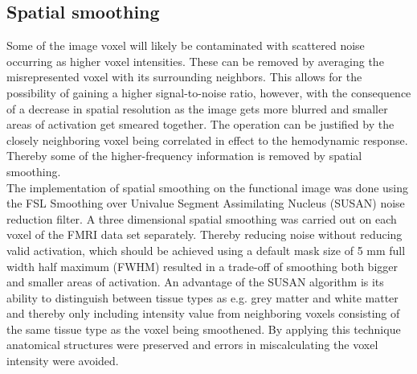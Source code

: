     
%
%

\subsection{Spatial smoothing}

Some of the image voxel will likely be contaminated with scattered noise occurring as higher voxel intensities. These can be removed by averaging the misrepresented voxel with its surrounding neighbors. This allows for the possibility of gaining a higher signal-to-noise ratio, however, with the consequence of a decrease in spatial resolution as the image gets more blurred and smaller areas of activation get smeared together. The operation can be justified by the closely neighboring voxel being correlated in effect to the hemodynamic response. Thereby some of the higher-frequency information is removed by spatial smoothing. \cite{Poldrack2011} \\
The implementation of spatial smoothing on the functional image was done using the FSL Smoothing over Univalue Segment Assimilating Nucleus (SUSAN) noise reduction filter. A three dimensional spatial smoothing was carried out on each voxel of the FMRI data set separately. Thereby reducing noise without reducing valid activation, which should be achieved using a default mask size of 5 mm full width half maximum (FWHM) resulted in a trade-off of smoothing both bigger and smaller areas of activation. An advantage of the SUSAN algorithm is its ability to distinguish between tissue types as e.g. grey matter and white matter and thereby only including intensity value from neighboring voxels consisting of the same tissue type as the voxel being smoothened. By applying this technique anatomical structures were preserved and errors in miscalculating the voxel intensity were avoided. \cite{Smith1997}  


